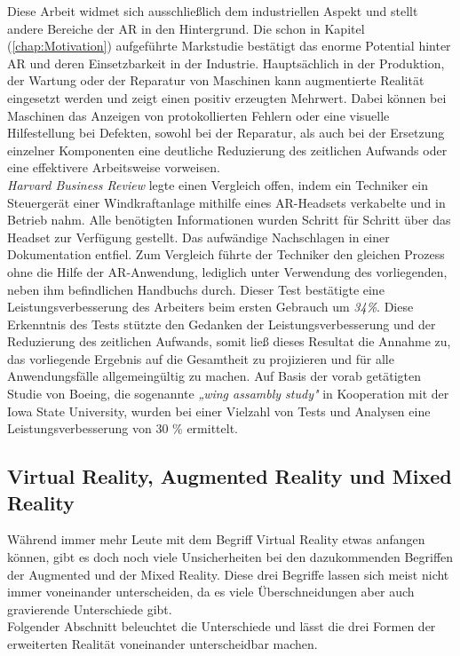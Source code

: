 Diese Arbeit widmet sich ausschließlich dem industriellen Aspekt und stellt andere Bereiche der \acl{AR} in den Hintergrund.
Die schon in Kapitel (\ref{chap:Motivation}) aufgeführte Markstudie bestätigt das enorme Potential hinter \acl{AR} und deren Einsetzbarkeit 
in der Industrie. Hauptsächlich in der Produktion, der Wartung oder der Reparatur von Maschinen kann augmentierte Realität eingesetzt werden 
und zeigt einen positiv erzeugten Mehrwert. Dabei können bei Maschinen das Anzeigen von protokollierten Fehlern oder eine visuelle 
Hilfestellung bei Defekten, sowohl bei der Reparatur, als auch bei der Ersetzung einzelner Komponenten eine deutliche Reduzierung des 
zeitlichen Aufwands oder eine effektivere Arbeitsweise vorweisen. 
\\
\textit{Harvard Business Review} legte einen Vergleich offen, indem ein Techniker ein Steuergerät einer Windkraftanlage mithilfe 
eines \acs{AR}-Headsets verkabelte und in Betrieb nahm. Alle benötigten Informationen wurden Schritt für Schritt über das Headset zur Verfügung 
gestellt. %
Das aufwändige Nachschlagen in einer Dokumentation entfiel. %
Zum Vergleich führte der Techniker den gleichen Prozess ohne die Hilfe der AR-Anwendung, lediglich unter Verwendung des vorliegenden, neben 
ihm befindlichen Handbuchs durch.
Dieser Test bestätigte eine Leistungsverbesserung des Arbeiters beim ersten Gebrauch um \textit{34\%}.\cite{harvardbr.2017m} Diese Erkenntnis 
des Tests stützte den Gedanken der Leistungsverbesserung und der Reduzierung des zeitlichen Aufwands, somit ließ dieses Resultat die Annahme zu, 
das vorliegende Ergebnis auf die Gesamtheit zu projizieren und für alle Anwendungsfälle allgemeingültig zu machen. Auf Basis der 
vorab getätigten Studie von Boeing, die sogenannte \textit{„wing assambly study"} in Kooperation mit der Iowa State University, wurden 
bei einer Vielzahl von Tests und Analysen eine Leistungsverbesserung von 30 \% ermittelt. \cite{boeingStudy.2015a}


\subsection{Virtual Reality, Augmented Reality und Mixed Reality}
Während immer mehr Leute mit dem Begriff Virtual Reality etwas anfangen können, gibt es doch noch viele Unsicherheiten bei den dazukommenden 
Begriffen der Augmented und der Mixed Reality. Diese drei Begriffe lassen sich meist nicht immer voneinander unterscheiden, da es viele 
Überschneidungen aber auch gravierende Unterschiede gibt. 
\\ 
Folgender Abschnitt beleuchtet die Unterschiede und lässt die drei Formen der erweiterten Realität voneinander unterscheidbar machen.
